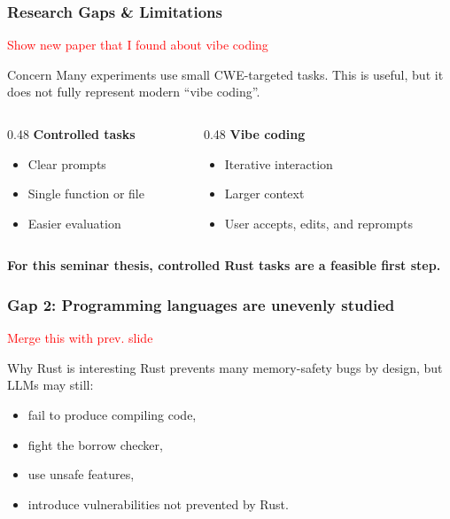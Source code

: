 \begin{frame}

\frametitle{Research Gaps \& Limitations}

\textcolor{red}{Show new paper that I found about vibe coding}

\begin{block}{Concern}
Many experiments use small CWE-targeted tasks. This is useful, but it does not fully represent modern ``vibe coding''.
\end{block}

\medskip

\begin{columns}[T]
\begin{column}{0.48\textwidth}
\textbf{Controlled tasks}
\begin{itemize}
    \item Clear prompts
    \item Single function or file
    \item Easier evaluation
\end{itemize}
\end{column}

\begin{column}{0.48\textwidth}
\textbf{Vibe coding}
\begin{itemize}
    \item Iterative interaction
    \item Larger context
    \item User accepts, edits, and reprompts
\end{itemize}
\end{column}
\end{columns}

\bigskip
\centering
\textbf{For this seminar thesis, controlled Rust tasks are a feasible first step.}

\end{frame}


\begin{frame}
\frametitle{Gap 2: Programming languages are unevenly studied}

\textcolor{red}{Merge this with prev. slide}

\begin{exampleblock}{Why Rust is interesting}
Rust prevents many memory-safety bugs by design, but LLMs may still:
\begin{itemize}
    \item fail to produce compiling code,
    \item fight the borrow checker,
    \item use unsafe features,
    \item introduce vulnerabilities not prevented by Rust.
\end{itemize}
\end{exampleblock}

\end{frame}

